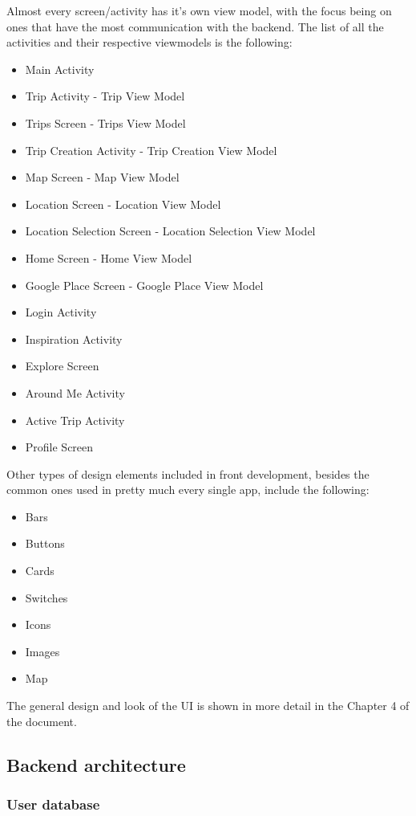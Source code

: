 Almost every screen/activity has it's own view model, with the focus being on ones that have the most communication with the backend. The list of all the activities and their respective viewmodels is the following:
\begin{itemize}
\item Main Activity		
\item Trip Activity	 - Trip View Model
\item Trips Screen	 - Trips View Model
\item Trip Creation Activity	- Trip Creation View Model
\item Map Screen	 - Map View Model
\item Location Screen	 - Location View Model
\item Location Selection Screen	- Location Selection View Model
\item Home Screen	 - Home View Model
\item Google Place Screen	 - Google Place View Model
\item Login Activity
\item Inspiration Activity
\item Explore Screen
\item Around Me Activity
\item Active Trip Activity
\item Profile Screen
\end{itemize}
Other types of design elements included in front development, besides the common ones used in pretty much every single app, include the following:
\begin{itemize}
\item Bars
\item Buttons
\item Cards
\item Switches
\item Icons
\item Images
\item Map
\end{itemize}
The general design and look of the UI is shown in more detail in the Chapter 4 of the document.
\newpage

\subsection{Backend architecture}
\subsubsection{User database}

